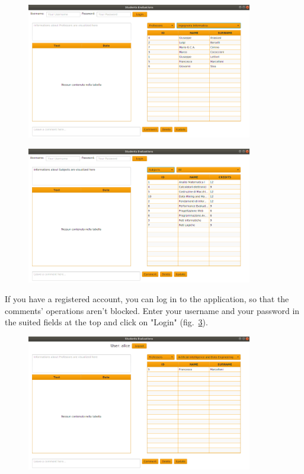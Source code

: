 \documentclass[a4paper]{article}
\begin{document}
\begin{figure}[h]
\centering
\includegraphics[width=0.88\textwidth]{images/screens/screen1}
\label{fig:screen1}
\end{figure}
\clearpage
\begin{figure}[h]
\centering
\includegraphics[width=0.88\textwidth]{images/screens/screen2}
\label{fig:screen2}
\end{figure}

If you have a registered account, you can log in to the application, so that the comments' operations aren't blocked. Enter your username and your password in the suited fields at the top and click on "Login" (fig.~\ref{fig:screenLogin}).
\begin{figure}[h]
\centering
\includegraphics[width=0.88\textwidth]{images/screens/screenLogin}
\label{fig:screenLogin}
\end{figure}
\end{document}
